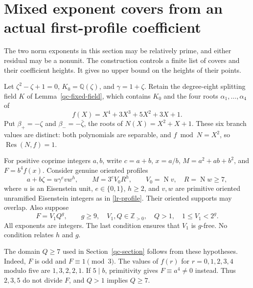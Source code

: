 \section{Mixed exponent covers from an actual first-profile coefficient}
\label{mx-section}

The two norm exponents in this section may be relatively prime, and
either residual may be a nonunit. The construction controls a finite
list of covers and their coefficient heights. It gives no upper bound
on the heights of their points.

Let $\zeta^2-\zeta+1=0$, $K_0=\mathbb Q(\zeta)$, and
$\gamma=1+\zeta$. Retain the degree-eight splitting field $K$ of
Lemma~\ref{qc-fixed-field}, which contains $K_0$ and the four roots
$\alpha_1,\ldots,\alpha_4$ of
\[
 f(X)=X^4+3X^3+5X^2+3X+1.
\]
Put $\beta_+=-\zeta$ and $\beta_-=-\bar\zeta$, the roots of
$N(X)=X^2+X+1$. These six branch values are distinct: both
polynomials are separable, and $f\bmod N=X^2$, so
$\operatorname{Res}(N,f)=1$.

For positive coprime integers $a,b$, write
$c=a+b$, $x=a/b$, $M=a^2+ab+b^2$, and $F=b^4f(x)$.
Consider genuine oriented profiles
\begin{equation}\label{mx-first-profile}
 a+b\zeta=u\gamma^e v w^h,\qquad
 M=3^eV_0R^h,\qquad V_0=\operatorname N v,\quad R=\operatorname N w\ge7,
\end{equation}
where $u$ is an Eisenstein unit, $e\in\{0,1\}$, $h\ge2$, and
$v,w$ are primitive oriented unramified Eisenstein integers as in
\eqref{lr-profile}. Their oriented supports may overlap. Also suppose
\begin{equation}\label{mx-second-profile}
 F=V_1Q^g,\qquad g\ge9,\quad V_1,Q\in\mathbb Z_{>0},\quad
 Q>1,\quad 1\le V_1<2^g.
\end{equation}
All exponents are integers. The last condition ensures that $V_1$ is
$g$-free. No condition relates $h$ and $g$.

The domain $Q\ge7$ used in Section~\ref{qc-section} follows from
these hypotheses. Indeed, $F$ is odd and $F\equiv1\pmod3$.
The values of $f(r)$ for $r=0,1,2,3,4$ modulo five are
$1,3,2,2,1$. If $5\mid b$, primitivity gives $F\equiv a^4\ne0$
instead. Thus $2,3,5$ do not divide $F$, and $Q>1$ implies $Q\ge7$.

